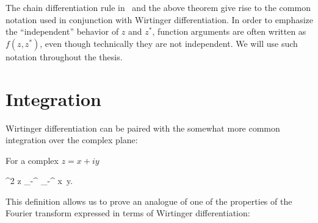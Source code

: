The chain differentiation rule in~ and the above theorem give rise to the common notation used in conjunction with Wirtinger differentiation.
In order to emphasize the ``independent'' behavior of $z$ and $z^*$, function arguments are often written as $f(z, z^*)$, even though technically they are not independent.
We will use such notation throughout the thesis.


\section{Integration}

Wirtinger differentiation can be paired with the somewhat more common integration over the complex plane:

\begin{definition}
\label{def:c-numbers:integration}
	For a complex $z = x + iy$
	\begin{eqn*}
		\int \upd^2 z \equiv \int_{-\infty}^{\infty} \int_{-\infty}^{\infty} \upd x\, \upd y.
	\end{eqn*}
\end{definition}

This definition allows us to prove an analogue of one of the properties of the Fourier transform expressed in terms of Wirtinger differentiation:

